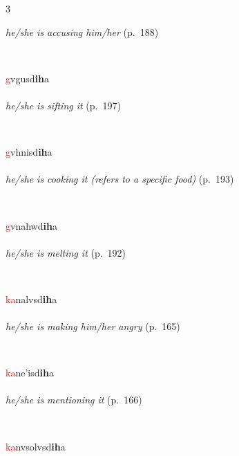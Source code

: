 \documentclass[oneside,openany]{book}%
\begin{document}
\begin{multicols}{3}
\begin{minipage}[t]{\linewidth}
\noindent \textit{he/she is accusing him/her} (p.~188)
\end{minipage}\\[1em]%
\begin{minipage}[t]{\linewidth}
\raggedright\noindent \textcolor{Red}{g}vgusd\textbf{ih}a\\
\\
\noindent \textit{he/she is sifting it} (p.~197)
\end{minipage}\\[1em]%
\begin{minipage}[t]{\linewidth}
\raggedright\noindent \textcolor{Red}{g}vhnisd\textbf{ih}a\\
\\
\noindent \textit{he/she is cooking it (refers to a specific food)} (p.~193)
\end{minipage}\\[1em]%
\begin{minipage}[t]{\linewidth}
\raggedright\noindent \textcolor{Red}{g}vnahwd\textbf{ih}a\\
\\
\noindent \textit{he/she is melting it} (p.~192)
\end{minipage}\\[1em]%
\begin{minipage}[t]{\linewidth}
\raggedright\noindent \textcolor{Red}{ka}nalvsd\textbf{ih}a\\
\\
\noindent \textit{he/she is making him/her angry} (p.~165)
\end{minipage}\\[1em]%
\begin{minipage}[t]{\linewidth}
\raggedright\noindent \textcolor{Red}{ka}ne'isd\textbf{ih}a\\
\\
\noindent \textit{he/she is mentioning it} (p.~166)
\end{minipage}\\[1em]%
\begin{minipage}[t]{\linewidth}
\raggedright\noindent \textcolor{Red}{ka}nvsolvsd\textbf{ih}a\\

\end{minipage}
\end{multicols}
\end{document}
